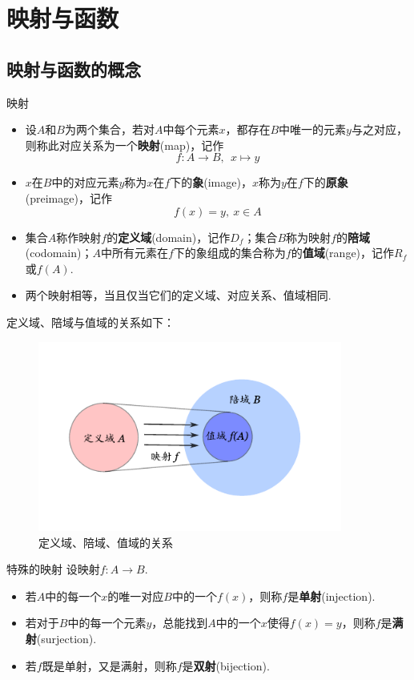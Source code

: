 \documentclass[lang=cn, zihao=5]{elegantbook}
\begin{document}
\section{映射与函数}

\subsection{映射与函数的概念}

\begin{definition}{映射}
	\begin{itemize}
		\item 设$A$和$B$为两个集合，若对$A$中每个元素$x$，都存在$B$中唯一的元素$y$与之对应，则称此对应关系为一个\textbf{映射}(map)，记作$$f:A \to B,~~x \mapsto y$$
		\item $x$在$B$中的对应元素$y$称为$x$在$f$下的\textbf{象}(image)，$x$称为$y$在$f$下的\textbf{原象}(preimage)，记作$$f(x) = y,~ x \in A$$
		\item 集合$A$称作映射$f$的\textbf{定义域}(domain)，记作$D_f$；集合$B$称为映射$f$的\textbf{陪域}(codomain)；$A$中所有元素在$f$下的象组成的集合称为$f$的\textbf{值域}(range)，记作$R_f$或$f(A)$.
		\item 两个映射相等，当且仅当它们的定义域、对应关系、值域相同.
	\end{itemize}
\end{definition}

定义域、陪域与值域的关系如下：

\begin{figure}[h!]
	\centering
	\includegraphics[width=10cm]{attachment/20230403ykue.pdf}
	\caption{定义域、陪域、值域的关系}
\end{figure}

\begin{definition}{特殊的映射}
	设映射$f:A \to B$.
	\begin{itemize}
		\item 若$A$中的每一个$x$的唯一对应$B$中的一个$f(x)$，则称$f$是\textbf{单射}(injection).
		\item 若对于$B$中的每一个元素$y$，总能找到$A$中的一个$x$使得$f(x)=y$，则称$f$是\textbf{满射}(surjection).
		\item 若$f$既是单射，又是满射，则称$f$是\textbf{双射}(bijection).
	\end{itemize}
\end{definition}
\end{document}
